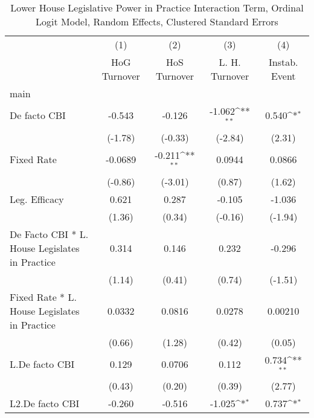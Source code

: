 {
\def\sym#1{\ifmmode^{#1}\else\(^{#1}\)\fi}
\begin{longtable}{l*{4}{c}}
\caption{Lower House Legislative Power in Practice Interaction Term, Ordinal Logit Model, Random Effects, Clustered Standard Errors \label{llpintlagordLogDF}}\\
\hline\hline\endfirsthead\hline\endhead\hline\endfoot\endlastfoot
                &\multicolumn{1}{c}{(1)}&\multicolumn{1}{c}{(2)}&\multicolumn{1}{c}{(3)}&\multicolumn{1}{c}{(4)}\\
                &\multicolumn{1}{c}{HoG Turnover}&\multicolumn{1}{c}{HoS Turnover}&\multicolumn{1}{c}{L. H. Turnover}&\multicolumn{1}{c}{Instab. Event}\\
\hline
main            &                  &                  &                  &                  \\
De facto CBI    &   -0.543         &   -0.126         &   -1.062\sym{**} &    0.540\sym{*}  \\
                &  (-1.78)         &  (-0.33)         &  (-2.84)         &   (2.31)         \\
[1em]
Fixed Rate      &  -0.0689         &   -0.211\sym{**} &   0.0944         &   0.0866         \\
                &  (-0.86)         &  (-3.01)         &   (0.87)         &   (1.62)         \\
[1em]
Leg. Efficacy   &    0.621         &    0.287         &   -0.105         &   -1.036         \\
                &   (1.36)         &   (0.34)         &  (-0.16)         &  (-1.94)         \\
[1em]
De Facto CBI * L. House Legislates in Practice&    0.314         &    0.146         &    0.232         &   -0.296         \\
                &   (1.14)         &   (0.41)         &   (0.74)         &  (-1.51)         \\
[1em]
Fixed Rate * L. House Legislates in Practice&   0.0332         &   0.0816         &   0.0278         &  0.00210         \\
                &   (0.66)         &   (1.28)         &   (0.42)         &   (0.05)         \\
[1em]
L.De facto CBI  &    0.129         &   0.0706         &    0.112         &    0.734\sym{**} \\
                &   (0.43)         &   (0.20)         &   (0.39)         &   (2.77)         \\
[1em]
L2.De facto CBI &   -0.260         &   -0.516         &   -1.025\sym{*}  &    0.737\sym{*}  \\

\end{longtable}}
